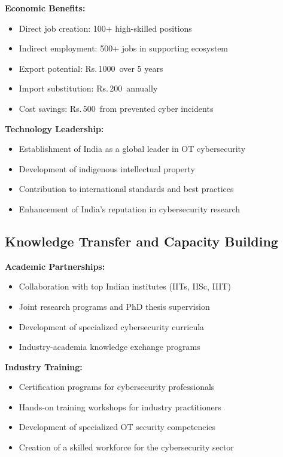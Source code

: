 \documentclass[12pt,a4paper]{article}
\newcommand{\rupees}{Rs.\,}
\newcommand{\crores}{\text{ Crores}}
\begin{document}
\textbf{Economic Benefits:}
\begin{itemize}
    \item Direct job creation: 100+ high-skilled positions
    \item Indirect employment: 500+ jobs in supporting ecosystem
    \item Export potential: \rupees 1000\crores\ over 5 years
    \item Import substitution: \rupees 200\crores\ annually
    \item Cost savings: \rupees 500\crores\ from prevented cyber incidents
\end{itemize}

\textbf{Technology Leadership:}
\begin{itemize}
    \item Establishment of India as a global leader in OT cybersecurity
    \item Development of indigenous intellectual property
    \item Contribution to international standards and best practices
    \item Enhancement of India's reputation in cybersecurity research
\end{itemize}

\subsection{Knowledge Transfer and Capacity Building}

\textbf{Academic Partnerships:}
\begin{itemize}
    \item Collaboration with top Indian institutes (IITs, IISc, IIIT)
    \item Joint research programs and PhD thesis supervision
    \item Development of specialized cybersecurity curricula
    \item Industry-academia knowledge exchange programs
\end{itemize}

\textbf{Industry Training:}
\begin{itemize}
    \item Certification programs for cybersecurity professionals
    \item Hands-on training workshops for industry practitioners
    \item Development of specialized OT security competencies
    \item Creation of a skilled workforce for the cybersecurity sector
\end{itemize}
\end{document}
